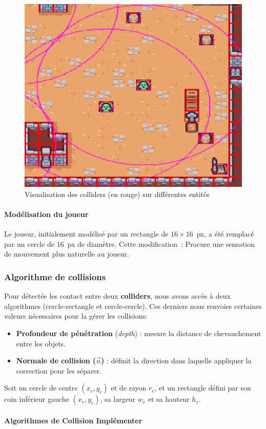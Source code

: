 \documentclass[a4paper,11pt]{article}
\begin{document}
\begin{figure}[ht]
    \centering
    \includegraphics[width=0.5\linewidth]{./img/debugCollider.png}
    \caption{Visualisation des colliders (en rouge) sur différentes entités}
    \label{fig:colliders_exemple}
\end{figure}

\paragraph{Modélisation du joueur} 
Le joueur, initialement modélisé par un rectangle de \(16 \times 16\)~px, a été remplacé par un cercle de \(16\)~px de diamètre. Cette modification~: Procure une sensation de mouvement plus naturelle au joueur.

\subsubsection{Algorithme de collisions}
Pour détectée les contact entre deux \textbf{colliders}, nous avons accès à deux algorithmes (cercle-rectangle et cercle-cercle). Ces derniers nous renvoies certaines valeurs nécessaires pour la gérer les collisions:
\begin{itemize}
\item \textbf{Profondeur de pénétration} (\textit{depth}) : mesure la distance de chevauchement entre les objets.
\item \textbf{Normale de collision (\(\vec{n}\))} : définit la direction dans laquelle appliquer la correction pour les séparer.
\end{itemize}

Soit un cercle de centre \((x_c, y_c)\) et de rayon \(r_c\), et un rectangle défini par son coin inférieur gauche \((x_r, y_r)\), sa largeur \(w_r\) et sa hauteur \(h_r\).  

\paragraph{Algorithmes de Collision Implémenter} \hfill
\end{document}
